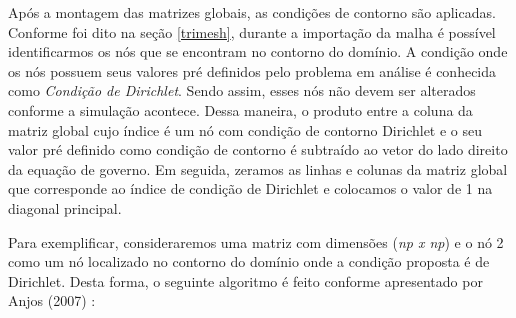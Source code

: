 Após a montagem das matrizes globais, as condições de contorno
são aplicadas. Conforme foi dito na seção \ref{trimesh}, durante a importação
da malha é possível identificarmos os nós que se encontram no
contorno do domínio. A condição onde os nós possuem seus valores 
pré definidos pelo problema em análise é conhecida como \textit{Condição 
de Dirichlet}. Sendo assim, esses nós não devem ser alterados conforme
a simulação acontece. Dessa maneira, o produto entre a coluna da matriz global cujo índice
é um nó com condição de contorno Dirichlet e o seu valor pré definido
como condição de contorno é subtraído ao vetor do
lado direito da equação de governo. Em seguida, zeramos as linhas e colunas
da matriz global que corresponde ao índice de condição de Dirichlet
e colocamos o valor de 1 na diagonal principal.

\medskip
Para exemplificar, consideraremos uma matriz 
com dimensões (\textit{np x np})
e o nó 2 como um nó localizado no
contorno do domínio onde a condição proposta
é de Dirichlet.
Desta forma, o seguinte algoritmo é feito conforme apresentado por Anjos (2007) \cite{anjos2007}:

